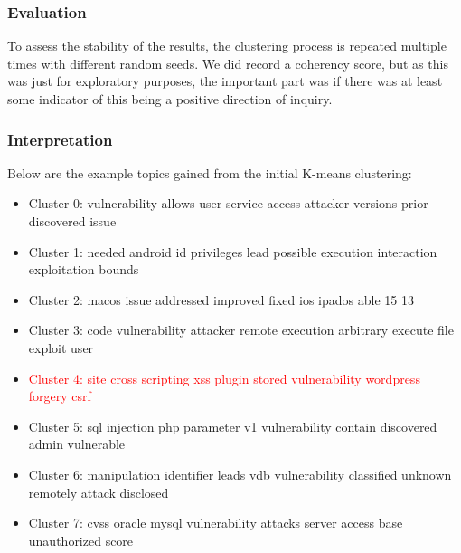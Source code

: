 \subsubsection{Evaluation}


To assess the stability of the results, the clustering process is repeated multiple times with different random seeds. We did record a coherency score, but as this was just for exploratory purposes, the important part was if there was at least some indicator of this being a positive direction of inquiry.

\subsubsection{Interpretation}

Below are the example topics gained from the initial K-means clustering:
\begin{itemize}

	\item Cluster 0: vulnerability allows user service access attacker versions prior discovered issue
	\item Cluster 1: needed android id privileges lead possible execution interaction exploitation bounds
	\item Cluster 2: macos issue addressed improved fixed ios ipados able 15 13
	\item Cluster 3: code vulnerability attacker remote execution arbitrary execute file exploit user
	\item \textcolor{red}{Cluster 4: site cross scripting xss plugin stored vulnerability wordpress forgery csrf}
	\item Cluster 5: sql injection php parameter v1 vulnerability contain discovered admin vulnerable
	\item Cluster 6: manipulation identifier leads vdb vulnerability classified unknown remotely attack disclosed
	\item Cluster 7: cvss oracle mysql vulnerability attacks server access base unauthorized score
\end{itemize}


